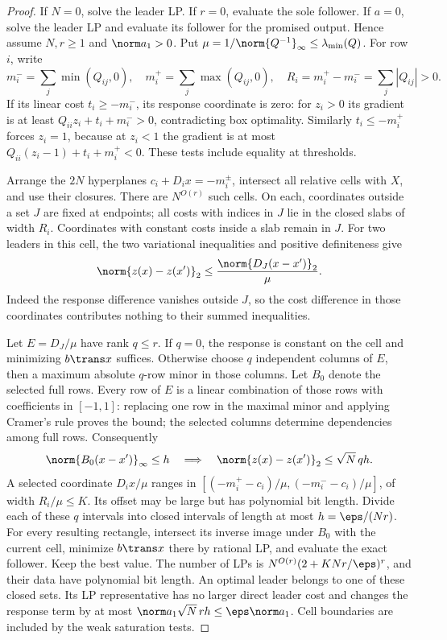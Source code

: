 \begin{proof}
If \(N=0\), solve the leader LP. If \(r=0\), evaluate the sole follower. If
\(a=0\), solve the leader LP and evaluate its follower for the promised output.
Hence assume \(N,r\ge1\) and \(\norm a_1>0\). Put
\(\mu=1/\norm{Q^{-1}}_\infty\le\lambda_{\min}(Q)\). For row \(i\), write
\[
 m_i^- =\sum_j\min(Q_{ij},0),\quad m_i^+=\sum_j\max(Q_{ij},0),\quad
 R_i=m_i^+-m_i^-=\sum_j|Q_{ij}|>0.
\]
If its linear cost \(t_i\ge-m_i^-\), its response coordinate is zero:
for \(z_i>0\) its gradient is at least \(Q_{ii}z_i+t_i+m_i^->0\),
contradicting box optimality. Similarly \(t_i\le-m_i^+\) forces \(z_i=1\),
because at \(z_i<1\) the gradient is at most
\(Q_{ii}(z_i-1)+t_i+m_i^+<0\). These tests include equality at thresholds.

Arrange the \(2N\) hyperplanes \(c_i+D_ix=-m_i^\pm\), intersect all relative
cells with \(X\), and use their closures. There are \(N^{O(r)}\) such cells.
On each, coordinates outside a set \(J\) are fixed at endpoints; all costs
with indices in \(J\) lie in the closed slabs of width \(R_i\). Coordinates
with constant costs inside a slab remain in \(J\). For two leaders in this
cell, the two variational inequalities and positive definiteness give
\begin{equation}\label{eq:cost-grid-sensitivity}
 \norm{z(x)-z(x')}_2\le\frac{\norm{D_J(x-x')}_2}{\mu}.
\end{equation}
Indeed the response difference vanishes outside \(J\), so the cost difference
in those coordinates contributes nothing to their summed inequalities.

Let \(E=D_J/\mu\) have rank \(q\le r\). If \(q=0\), the response is constant
on the cell and minimizing \(b\trans x\) suffices. Otherwise choose \(q\)
independent columns of \(E\), then a maximum absolute \(q\)-row minor in those
columns. Let \(B_0\) denote the selected full rows. Every row of \(E\) is a
linear combination of those rows with coefficients in \([-1,1]\): replacing
one row in the maximal minor and applying Cramer's rule proves the bound;
the selected columns determine dependencies among full rows. Consequently
\[
 \norm{B_0(x-x')}_\infty\le h
 \quad\Longrightarrow\quad \norm{z(x)-z(x')}_2\le\sqrt N\,qh.
\]
A selected coordinate \(D_ix/\mu\) ranges in
\([(-m_i^+-c_i)/\mu,(-m_i^--c_i)/\mu]\), of width
\(R_i/\mu\le K\). Its offset may be large but has polynomial bit length.
Divide each of these \(q\) intervals into closed intervals of length at most
\(h=\eps/(Nr)\). For every resulting rectangle, intersect its inverse image
under \(B_0\) with the current cell, minimize \(b\trans x\) there by rational
LP, and evaluate the exact follower. Keep the best value. The number of LPs is
\(N^{O(r)}(2+KNr/\eps)^r\), and their data have polynomial bit length.
An optimal leader belongs to one of these closed sets. Its LP representative
has no larger direct leader cost and changes the response term by at most
\(\norm a_1\sqrt N\,rh\le\eps\norm a_1\). Cell boundaries are included by the
weak saturation tests.


\end{proof}
